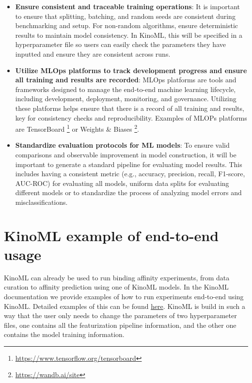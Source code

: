 \documentclass[9pt,lessons]{livecoms}
\begin{document}
\begin{itemize}
\item\textbf{Ensure consistent and traceable training operations}: It is important to ensure that splitting, batching, and random seeds are consistent during benchmarking and setup. For non-random algorithms, ensure deterministic results to maintain model consistency. In KinoML, this will be specified in a hyperparameter file so users can easily check the parameters they have inputted and ensure they are consistent across runs. 

\item\textbf{Utilize MLOps platforms to track development progress and ensure all training and results are recorded}: MLOps platforms are tools and frameworks designed to manage the end-to-end machine learning lifecycle, including development, deployment, monitoring, and governance. Utilizing these platforms helps ensure that there is a record of all training and results, key for consistency checks and reproducibility. Examples of MLOPs platforms are TensorBoard \footnote{\href{https://www.tensorflow.org/tensorboard}{https://www.tensorflow.org/tensorboard}} or Weights \& Biases \footnote{\href{https://wandb.ai/site}{https://wandb.ai/site}}.

\item\textbf{Standardize evaluation protocols for ML models}: To ensure valid comparisons and observable improvement in model construction, it will be important to generate a standard pipeline for evaluating model results. This includes having a consistent metric (e.g., accuracy, precision, recall, F1-score, AUC-ROC) for evaluating all models, uniform data splits for evaluating different models or to standardize the process of analyzing model errors and misclassifications.


\end{itemize}

\section{KinoML example of end-to-end usage}

KinoML can already be used to run binding affinity experiments, from data curation to affinity prediction using one of KinoML models. In the KinoML documentation we provide examples of how to run experiments end-to-end using KinoML. Detailed examples of this can be found \hyperlink{https://github.com/openkinome/kinoml/tree/master/tutorials/experiments}{here}. KinoML is build in such a way that the user only needs to change the parameters of two hyperparameter files, one contains all the featurization pipeline information, and the other one contains the model training information. 
\end{document}
